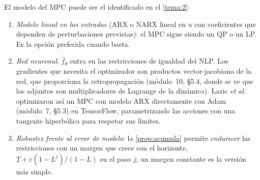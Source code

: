 El modelo del MPC puede ser el identificado en el \cref{tema:2}:
\begin{enumerate}
  \item \emph{Modelo lineal en las entradas} (ARX o NARX lineal en $u$ con coeficientes que dependen de perturbaciones previstas): el MPC sigue siendo un QP o un LP. Es la opción preferida cuando basta.
  \item \emph{Red neuronal}: $\hat f_\theta$ entra en las restricciones de igualdad del NLP. Los gradientes que necesita el optimizador son productos vector-jacobiano de la red, que proporciona la retropropagación (módulo~10, §5.4, donde se ve que los adjuntos son multiplicadores de Lagrange de la dinámica). Lazic \emph{et al.}~\cite{lazic} optimizaron así un MPC con modelo ARX directamente con Adam (módulo~7, §5.3) en TensorFlow, parametrizando las acciones con una tangente hiperbólica para respetar sus límites.
  \item \emph{Robustez frente al error de modelo}: la \cref{prop:acumula} permite \emph{endurecer} las restricciones con un margen que crece con el horizonte, $\underline T+\varepsilon(1-L^{j})/(1-L)$ en el paso $j$; un margen constante es la versión más simple.
\end{enumerate}

\addtocounter{definicion}{1}%

\addtocounter{definicion}{1}%

